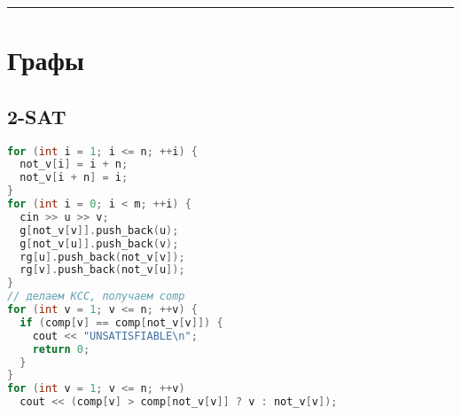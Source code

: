\documentclass[9pt,a4paper,landscape,twosided]{extarticle}
\begin{document}
\begin{multicols*}{3}
\noindent\rule{\linewidth}{0.15mm}

\section{Графы}

\subsection{2-SAT}
\begin{lstlisting}[language=C++]
for (int i = 1; i <= n; ++i) {
  not_v[i] = i + n;
  not_v[i + n] = i;
}
for (int i = 0; i < m; ++i) {
  cin >> u >> v;
  g[not_v[v]].push_back(u);
  g[not_v[u]].push_back(v);
  rg[u].push_back(not_v[v]);
  rg[v].push_back(not_v[u]);
}
// делаем КСС, получаем comp
for (int v = 1; v <= n; ++v) {
  if (comp[v] == comp[not_v[v]]) {
    cout << "UNSATISFIABLE\n";
    return 0;
  }
}
for (int v = 1; v <= n; ++v)
  cout << (comp[v] > comp[not_v[v]] ? v : not_v[v]);
\end{lstlisting}


\end{multicols*}
\end{document}
